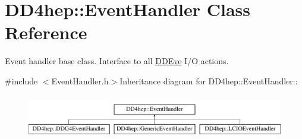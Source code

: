 \hypertarget{class_d_d4hep_1_1_event_handler}{
\section{DD4hep::EventHandler Class Reference}
\label{class_d_d4hep_1_1_event_handler}
}


Event handler base class. Interface to all \hyperlink{struct_d_d4hep_1_1_d_d_eve}{DDEve} I/O actions.  


{\ttfamily \#include $<$EventHandler.h$>$}Inheritance diagram for DD4hep::EventHandler::\begin{figure}[H]
\begin{center}
\leavevmode
\includegraphics[height=1.9244cm]{class_d_d4hep_1_1_event_handler}
\end{center}
\end{figure}
